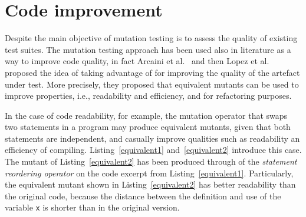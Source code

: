 

\chapter{Code improvement}

Despite the main objective of mutation testing is to assess the quality of existing test suites. The mutation testing approach has been used also in literature as a way to improve code quality,
in fact Arcaini et al.~\cite{arcaini2017novel,arcaini2015rehabilitating} and then Lopez et al.~\cite{lopez2018source} proposed the idea of taking advantage of  for improving the quality of the artefact under test.
More precisely, they proposed that equivalent mutants can be used to improve  properties, i.e., readability and efficiency, and for refactoring purposes.



In the case of code readability, for example, the mutation operator that swaps two statements in a program may produce equivalent mutants, given that both statements are independent, and casually improve qualities such as readability an efficiency of compiling. 
Listing~\ref{equivalent1} and~\ref{equivalent2} introduce this case. The mutant of Listing~\ref{equivalent2} has been produced through of the \textit{statement reordering operator} on the code excerpt from Listing~\ref{equivalent1}.
Particularly, the equivalent mutant shown in Listing~\ref{equivalent2} has better readability than the original code, because the distance between the definition and use of the variable \texttt{x} is shorter than in the original version.

